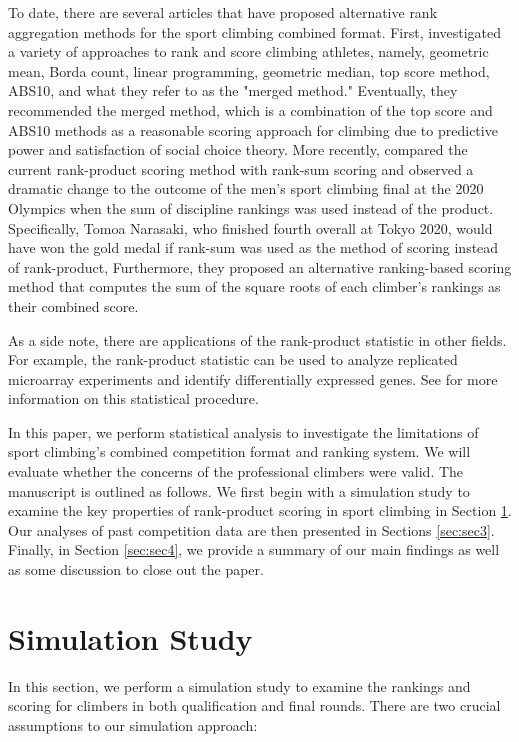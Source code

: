 \documentclass[letterpaper, inpress]{jds} %
\begin{document}
To date, there are several articles that have proposed alternative rank aggregation methods for the sport climbing combined format. First, \cite{Parker2018} investigated a variety of approaches to rank and score climbing athletes, namely, geometric mean, Borda count, linear programming, geometric median, top score method, ABS10, and what they refer to as the "merged method." Eventually, they recommended the merged method, which is a combination of the top score and ABS10 methods as a reasonable scoring approach for climbing due to predictive power and satisfaction of social choice theory. More recently, \cite{StinsonStinson2021} compared the current rank-product scoring method with rank-sum scoring and observed a dramatic change to the outcome of the men's sport climbing final at the 2020 Olympics when the sum of discipline rankings was used instead of the product. Specifically, Tomoa Narasaki, who finished fourth overall at Tokyo 2020, would have won the gold medal if rank-sum was used as the method of scoring instead of rank-product, Furthermore, they proposed an alternative ranking-based scoring method that computes the sum of the square roots of each climber's rankings as their combined score.

As a side note, there are applications of the rank-product statistic in other fields. For example, the rank-product statistic can be used to analyze replicated microarray experiments and identify differentially expressed genes. See \cite{Breitling2004} for more information on this statistical procedure.

In this paper, we perform statistical analysis to investigate the limitations of sport climbing's combined competition format and ranking system. We will evaluate whether the concerns of the professional climbers were valid. The manuscript is outlined as follows. We first begin with a simulation study to examine the key properties of rank-product scoring in sport climbing in Section \ref{sec:sec2}. Our analyses of past competition data are then presented in Sections \ref{sec:sec3}. Finally, in Section \ref{sec:sec4}, we provide a summary of our main findings as well as some discussion to close out the paper.


\section{Simulation Study}
\label{sec:sec2}

In this section, we perform a simulation study to examine the rankings
and scoring for climbers in both qualification and final rounds. There
are two crucial assumptions to our simulation approach:
\end{document}
